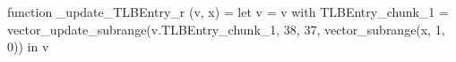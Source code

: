 function _update_TLBEntry_r (v, x) = let v = { v with TLBEntry_chunk_1 = vector_update_subrange(v.TLBEntry_chunk_1, 38, 37, vector_subrange(x, 1, 0)) } in v
